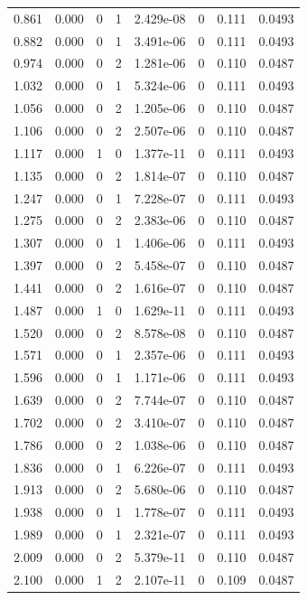 \documentclass[preview]{standalone}
\begin{document}
{{\begin{tabular}{L{1.2cm}C{1.2cm} C{0.3cm}C{0.5cm} C{1.4cm}C{1.4cm} C{1.4cm}C{1.4cm}}
  0.861  &  0.000  & 0     &  1 &  2.429e-08  & 0  & 0.111 &  0.0493   \\ 
  0.882  &  0.000  & 0     &  1 &  3.491e-06  & 0  & 0.111 &  0.0493   \\ 
  0.974  &  0.000  & 0     &  2 &  1.281e-06  & 0  & 0.110 &  0.0487   \\ 
  1.032  &  0.000  & 0     &  1 &  5.324e-06  & 0  & 0.111 &  0.0493   \\ 
  1.056  &  0.000  & 0     &  2 &  1.205e-06  & 0  & 0.110 &  0.0487   \\ 
  1.106  &  0.000  & 0     &  2 &  2.507e-06  & 0  & 0.110 &  0.0487   \\ 
  1.117  &  0.000  & 1     &  0 &  1.377e-11  & 0  & 0.111 &  0.0493   \\ 
  1.135  &  0.000  & 0     &  2 &  1.814e-07  & 0  & 0.110 &  0.0487   \\ 
  1.247  &  0.000  & 0     &  1 &  7.228e-07  & 0  & 0.111 &  0.0493   \\ 
  1.275  &  0.000  & 0     &  2 &  2.383e-06  & 0  & 0.110 &  0.0487   \\ 
  1.307  &  0.000  & 0     &  1 &  1.406e-06  & 0  & 0.111 &  0.0493   \\ 
  1.397  &  0.000  & 0     &  2 &  5.458e-07  & 0  & 0.110 &  0.0487   \\ 
  1.441  &  0.000  & 0     &  2 &  1.616e-07  & 0  & 0.110 &  0.0487   \\ 
  1.487  &  0.000  & 1     &  0 &  1.629e-11  & 0  & 0.111 &  0.0493   \\ 
  1.520  &  0.000  & 0     &  2 &  8.578e-08  & 0  & 0.110 &  0.0487   \\ 
  1.571  &  0.000  & 0     &  1 &  2.357e-06  & 0  & 0.111 &  0.0493   \\ 
  1.596  &  0.000  & 0     &  1 &  1.171e-06  & 0  & 0.111 &  0.0493   \\ 
  1.639  &  0.000  & 0     &  2 &  7.744e-07  & 0  & 0.110 &  0.0487   \\ 
  1.702  &  0.000  & 0     &  2 &  3.410e-07  & 0  & 0.110 &  0.0487   \\ 
  1.786  &  0.000  & 0     &  2 &  1.038e-06  & 0  & 0.110 &  0.0487   \\ 
  1.836  &  0.000  & 0     &  1 &  6.226e-07  & 0  & 0.111 &  0.0493   \\ 
  1.913  &  0.000  & 0     &  2 &  5.680e-06  & 0  & 0.110 &  0.0487   \\ 
  1.938  &  0.000  & 0     &  1 &  1.778e-07  & 0  & 0.111 &  0.0493   \\ 
  1.989  &  0.000  & 0     &  1 &  2.321e-07  & 0  & 0.111 &  0.0493   \\ 
  2.009  &  0.000  & 0     &  2 &  5.379e-11  & 0  & 0.110 &  0.0487   \\ 
  2.100  &  0.000  & 1     &  2 &  2.107e-11  & 0  & 0.109 &  0.0487   \\ 
\hline 
\end{tabular} 

}}
\end{document}
